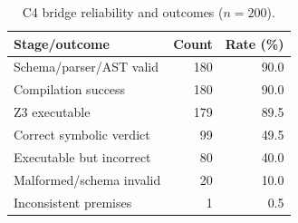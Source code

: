 \begin{table}[t]
\caption{C4 bridge reliability and outcomes ($n=200$).}
\label{tab:bridge}
\centering
\small
\begin{tabular}{lrr}
\toprule
Stage/outcome & Count & Rate (\%) \\
\midrule
Schema/parser/AST valid & 180 & 90.0 \\
Compilation success & 180 & 90.0 \\
Z3 executable & 179 & 89.5 \\
Correct symbolic verdict & 99 & 49.5 \\
Executable but incorrect & 80 & 40.0 \\
Malformed/schema invalid & 20 & 10.0 \\
Inconsistent premises & 1 & 0.5 \\
\bottomrule
\end{tabular}
\end{table}

